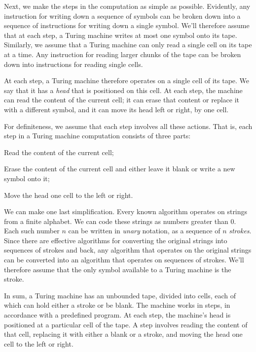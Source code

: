 Next,
we make the steps in the computation as simple as possible.
Evidently,
any instruction for writing down a sequence of symbols
can be broken down into a sequence of instructions
for writing down a single symbol.
We'll therefore assume that
at each step,
a Turing machine writes at most one symbol onto its tape.
Similarly,
we assume that a Turing machine
can only read a single cell on its tape at a time.
Any instruction for reading larger chunks of the tape
can be broken down into instructions for
reading single cells.

At each step,
a Turing machine therefore operates on a single cell of its tape.
We say that it has a \emph{head} that is positioned on this cell.
At each step,
the machine can read the content of the current cell;
it can erase that content or replace it with a different symbol,
and it can move its head left or right,
by one cell.

For definiteness,
we assume that
each step involves all these actions.
That is,
each step in a Turing machine computation consists of three parts:

\begin{cenumerate}
  \item Read the content of the current cell;
  \item Erase the content of the current cell and
  either leave it blank or write a new symbol onto it;
  \item Move the head one cell to the left or right.
\end{cenumerate}

We can make one last simplification.
Every known algorithm operates on strings from a finite alphabet.
We can code these strings as numbers greater than 0.
Each such number $n$ can be written in \emph{unary} notation,
as a sequence of $n$ \emph{strokes}.
Since there are effective algorithms for converting
the original strings into sequences of strokes and back,
any algorithm that operates on the original strings can be converted
into an algorithm that operates on sequences of strokes.
We'll therefore assume that
the only symbol available to a Turing machine is the stroke.

In sum,
a Turing machine has an unbounded tape,
divided into cells,
each of which can hold either a stroke or be blank.
The machine works in steps,
in accordance with a predefined program.
At each step,
the machine's head is positioned at a particular cell of the tape.
A step involves
reading the content of that cell,
replacing it with either a blank or a stroke,
and moving the head one cell to the left or right.

